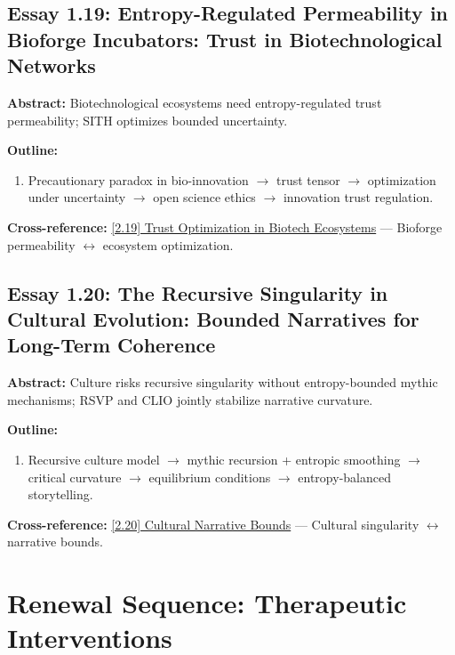 \documentclass[12pt,a4paper]{article}
\begin{document}
\subsection{Essay 1.19: Entropy-Regulated Permeability in Bioforge Incubators: Trust in Biotechnological Networks}
\label{sec:essay1-19}

\textbf{Abstract:} Biotechnological ecosystems need entropy-regulated trust permeability; SITH optimizes bounded uncertainty.

\textbf{Outline:}
\begin{enumerate}
\item Precautionary paradox in bio-innovation $\to$ trust tensor  $\to$ optimization under uncertainty $\to$ open science ethics $\to$ innovation trust regulation.
\end{enumerate}

\textbf{Cross-reference:} \hyperref[sec:essay2-19]{[2.19] Trust Optimization in Biotech Ecosystems} --- Bioforge permeability $\leftrightarrow$ ecosystem optimization.

\subsection{Essay 1.20: The Recursive Singularity in Cultural Evolution: Bounded Narratives for Long-Term Coherence}
\label{sec:essay1-20}

\textbf{Abstract:} Culture risks recursive singularity without entropy-bounded mythic mechanisms; RSVP and CLIO jointly stabilize narrative curvature.

\textbf{Outline:}
\begin{enumerate}
\item Recursive culture model $\to$ mythic recursion + entropic smoothing $\to$ critical curvature  $\to$ equilibrium conditions $\to$ entropy-balanced storytelling.
\end{enumerate}

\textbf{Cross-reference:} \hyperref[sec:essay2-20]{[2.20] Cultural Narrative Bounds} --- Cultural singularity $\leftrightarrow$ narrative bounds.

\section{Renewal Sequence: Therapeutic Interventions}
\label{sec:renewal}
\end{document}
